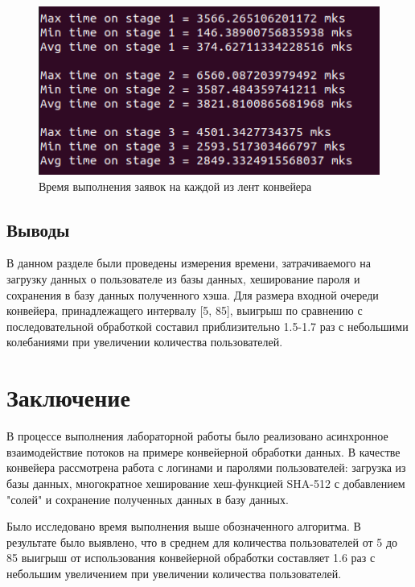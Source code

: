 \documentclass[12pt]{report}
\begin{document}
    \captionsetup{singlelinecheck=true}
    \begin{figure}[H]
    	\centering
    	\includegraphics[width=0.65\linewidth]{img/maxmintime}
    	\caption{Время выполнения заявок на каждой из лент конвейера}
    	\label{fig:maxmintime}
    \end{figure}
    
    
    \section{Выводы}
    В данном разделе были проведены измерения времени, затрачиваемого на загрузку данных о пользователе из базы данных, хеширование пароля и сохранения в базу данных полученного хэша.
    Для размера входной очереди конвейера, принадлежащего интервалу [5, 85], выигрыш по сравнению с последовательной обработкой составил приблизительно 1.5-1.7 раз с небольшими колебаниями при увеличении количества пользователей.
    \newpage
    
    \chapter*{Заключение}
    В процессе выполнения лабораторной работы было реализовано асинхронное взаимодействие потоков на примере конвейерной обработки данных. В качестве конвейера рассмотрена работа с логинами и паролями пользователей: загрузка из базы данных, многократное хеширование хеш-функцией SHA-512 с добавлением "солей" и сохранение полученных данных в базу данных.
    
    Было исследовано время выполнения выше обозначенного алгоритма. В результате было выявлено, что в среднем для количества пользователей от 5 до 85 выигрыш от использования конвейерной обработки составляет 1.6 раз с небольшим увеличением при увеличении количества пользователей.
    
    \newpage

\end{document}
